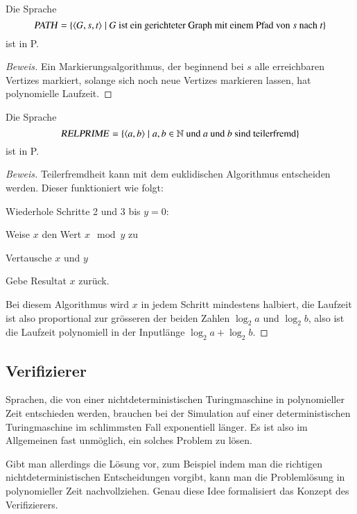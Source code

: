 \begin{satz}
%
Die Sprache
\[
\text{\textsl{PATH}}
=\{
\langle G,s,t\rangle
\;|\;\text{$G$ ist ein gerichteter Graph mit einem Pfad von $s$ nach $t$}
\}
\]
ist in P.
\end{satz}

\begin{proof}[Beweis]
%
Ein Markierungsalgorithmus, der beginnend bei $s$ alle erreichbaren
Vertizes markiert, solange sich noch neue Vertizes markieren lassen,
hat polynomielle Laufzeit.
\end{proof}

\begin{satz}
%
Die Sprache
\[
\text{\textsl{RELPRIME}}
=\{
\langle a,b\rangle \;|\;
\text{$a, b\in \mathbb N$ und $a$ und $b$ sind teilerfremd}
\}
\]
ist in P.
\end{satz}

\begin{proof}[Beweis]
%
Teilerfremdheit kann mit dem euklidischen Algorithmus entscheiden werden.
Dieser funktioniert wie folgt:
\begin{compactenum}
\item Wiederhole Schritte 2 und 3 bis $y=0$:
\item Weise $x$ den Wert $x\mod y$ zu
\item Vertausche $x$ und $y$
\item Gebe Resultat $x$ zurück.
\end{compactenum}
Bei diesem Algorithmus wird $x$ in jedem Schritt mindestens halbiert,
die Laufzeit ist also proportional zur grösseren der
beiden Zahlen $\log_2 a$ und $\log_2 b$, also ist die Laufzeit
polynomiell in der Inputlänge $\log_2 a+\log_2 b$.
\end{proof}

\subsection{Verifizierer}
Sprachen, die von einer nichtdeterministischen Turingmaschine
in polynomieller Zeit entschieden werden, brauchen bei der
Simulation auf einer deterministischen Turingmaschine im
schlimmsten Fall exponentiell länger. Es ist also im
Allgemeinen fast unmöglich, ein solches Problem zu lösen.

Gibt man allerdings die Lösung vor, zum Beispiel indem man
die richtigen nichtdeterministischen Entscheidungen vorgibt,
kann man die Problemlösung in polynomieller Zeit nachvollziehen.
Genau diese Idee formalisiert das Konzept des Verifizierers.

